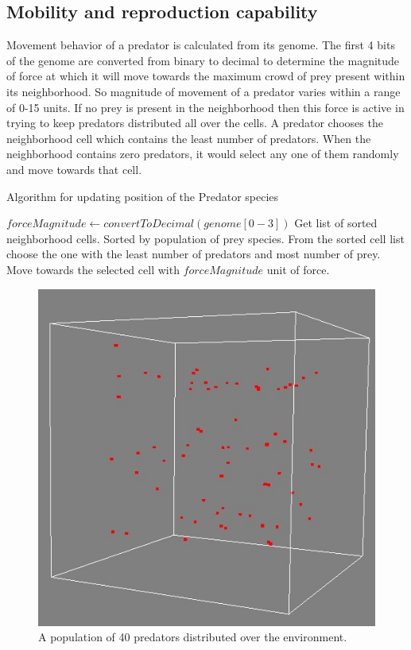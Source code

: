 \subsection{Mobility and reproduction capability}
Movement behavior of a predator is calculated from its genome. The first 4 bits of the genome are converted from binary to decimal to determine the magnitude of force at which it will move towards the maximum crowd of prey present within its neighborhood. So magnitude of movement of a predator varies within a range of 0-15 units. If no prey is present in the neighborhood then this force is active in trying to keep predators distributed all over the cells. A predator chooses the neighborhood cell which contains the least number of predators. When the neighborhood contains zero predators, it would select any one of them randomly and move towards that cell.

\begin{algorithm}[h]
	\caption{Algorithm for updating position of the Predator species}
	\label{algo:algorithm-movement-predator}
	\begin{algorithmic}
			\STATE $forceMagnitude \gets convertToDecimal(genome[0-3])$
			\STATE Get list of sorted neighborhood cells. Sorted by population of prey species.
			\STATE From the sorted cell list choose the one with the least number of predators and most number of prey.
			\STATE Move towards the selected cell with $forceMagnitude$ unit of force.
		\ENDFOR
	\end{algorithmic}
\end{algorithm}

\begin{figure}[H]
	\centering
	\includegraphics[scale=0.40]{images/predators-40}
	\caption{A population of 40 predators distributed over the environment.}
	\label{fig:predators-40}
\end{figure}

